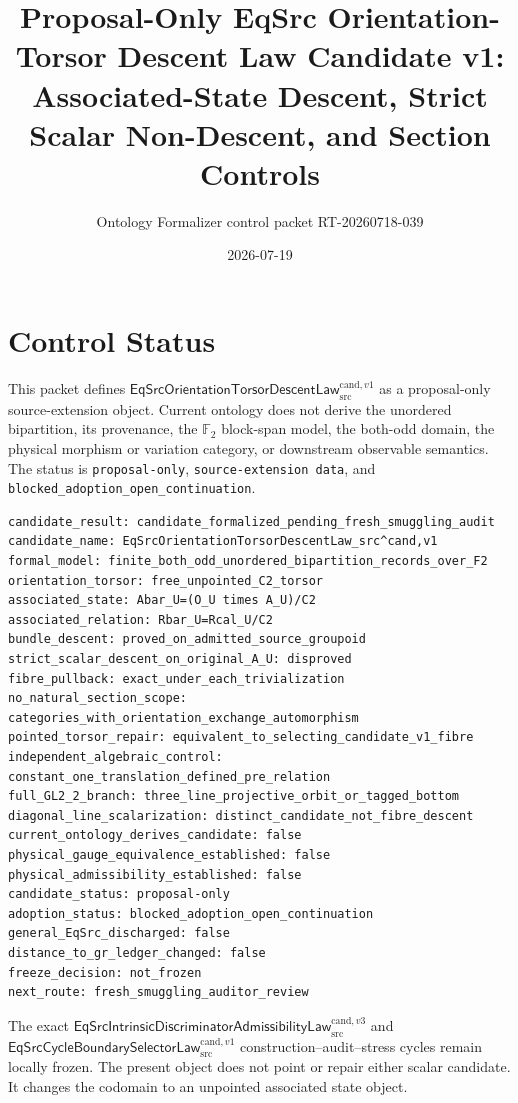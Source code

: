 \documentclass[11pt]{article}
\title{Proposal-Only EqSrc Orientation-Torsor Descent Law Candidate v1:\\
Associated-State Descent, Strict Scalar Non-Descent, and Section Controls}
\author{Ontology Formalizer control packet RT-20260718-039}
\date{2026-07-19}
\newcommand{\Ftwo}{\mathbb F_2}
\newcommand{\EqBundle}{\mathsf{EqSrcOrientationTorsorDescentLaw}^{\mathrm{cand},v1}_{\mathrm{src}}}
\begin{document}
\maketitle

\section{Control Status}

This packet defines \(\EqBundle\) as a proposal-only source-extension object.
Current ontology does not derive the unordered bipartition, its provenance,
the \(\Ftwo\) block-span model, the both-odd domain, the physical morphism or
variation category, or downstream observable semantics. The status is
\texttt{proposal-only}, \texttt{source-extension data}, and
\texttt{blocked\_adoption\_open\_continuation}.

\begin{verbatim}
candidate_result: candidate_formalized_pending_fresh_smuggling_audit
candidate_name: EqSrcOrientationTorsorDescentLaw_src^cand,v1
formal_model: finite_both_odd_unordered_bipartition_records_over_F2
orientation_torsor: free_unpointed_C2_torsor
associated_state: Abar_U=(O_U times A_U)/C2
associated_relation: Rbar_U=Rcal_U/C2
bundle_descent: proved_on_admitted_source_groupoid
strict_scalar_descent_on_original_A_U: disproved
fibre_pullback: exact_under_each_trivialization
no_natural_section_scope: categories_with_orientation_exchange_automorphism
pointed_torsor_repair: equivalent_to_selecting_candidate_v1_fibre
independent_algebraic_control: constant_one_translation_defined_pre_relation
full_GL2_2_branch: three_line_projective_orbit_or_tagged_bottom
diagonal_line_scalarization: distinct_candidate_not_fibre_descent
current_ontology_derives_candidate: false
physical_gauge_equivalence_established: false
physical_admissibility_established: false
candidate_status: proposal-only
adoption_status: blocked_adoption_open_continuation
general_EqSrc_discharged: false
distance_to_gr_ledger_changed: false
freeze_decision: not_frozen
next_route: fresh_smuggling_auditor_review
\end{verbatim}

The exact
\(\mathsf{EqSrcIntrinsicDiscriminatorAdmissibilityLaw}^{\mathrm{cand},v3}_{\mathrm{src}}\)
and
\(\mathsf{EqSrcCycleBoundarySelectorLaw}^{\mathrm{cand},v1}_{\mathrm{src}}\)
construction--audit--stress cycles remain locally frozen. The present object
does not point or repair either scalar candidate. It changes the codomain to
an unpointed associated state object.
\end{document}
